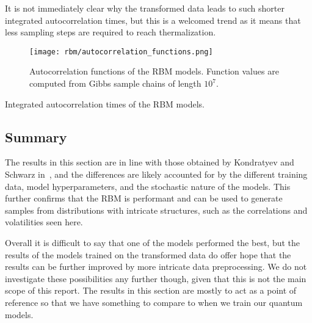 It is not immediately clear why the transformed data leads to such shorter integrated autocorrelation times, but this is a welcomed trend as it means that less sampling steps are required to reach thermalization.
\begin{figure}[!htb]
    \begin{center}
        \texttt{[image: rbm/autocorrelation\_functions.png]}
    \end{center}
    \caption{Autocorrelation functions of the RBM models. Function values are computed from Gibbs sample chains of length \( 10^7 \).}
    \label{fig:rbm_autocorrelation_functions}
\end{figure}
\begin{table}[!htb]
    \centering
    \begin{adjustbox}{max width=\textwidth}
        
    \end{adjustbox}
    \caption{Integrated autocorrelation times of the RBM models.}
    \label{tbl:rbm_ac_times}
\end{table}

\subsection{Summary}
The results in this section are in line with those obtained by Kondratyev and Schwarz in~\cite{kondratyev_2019}, and the differences are likely accounted for by the different training data, model hyperparameters, and the stochastic nature of the models.
This further confirms that the RBM is performant and can be used to generate samples from distributions with intricate structures, such as the correlations and volatilities seen here.

Overall it is difficult to say that one of the models performed the best, but the results of the models trained on the transformed data do offer hope that the results can be further improved by more intricate data preprocessing.
We do not investigate these possibilities any further though, given that this is not the main scope of this report.
The results in this section are mostly to act as a point of reference so that we have something to compare to when we train our quantum models.
